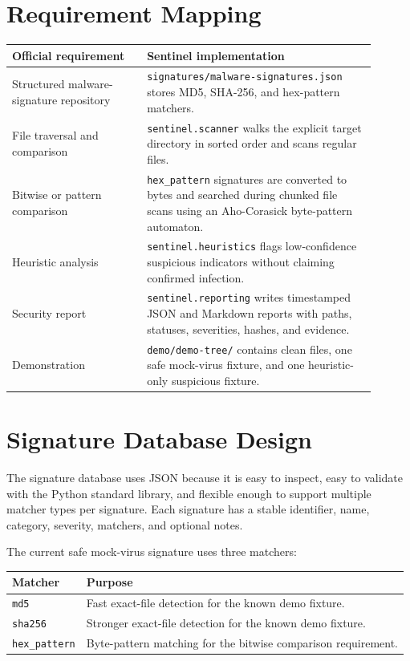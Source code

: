 \documentclass[11pt]{article}
\begin{document}
\section{Requirement Mapping}

\begin{longtable}{p{0.33\linewidth}p{0.57\linewidth}}
\toprule
\textbf{Official requirement} & \textbf{Sentinel implementation} \\
\midrule
Structured malware-signature repository &
\texttt{signatures/malware-signatures.json} stores MD5, SHA-256, and
hex-pattern matchers. \\
File traversal and comparison &
\texttt{sentinel.scanner} walks the explicit target directory in sorted order
and scans regular files. \\
Bitwise or pattern comparison &
\texttt{hex\_pattern} signatures are converted to bytes and searched during
chunked file scans using an Aho-Corasick byte-pattern automaton. \\
Heuristic analysis &
\texttt{sentinel.heuristics} flags low-confidence suspicious indicators without
claiming confirmed infection. \\
Security report &
\texttt{sentinel.reporting} writes timestamped JSON and Markdown reports with
paths, statuses, severities, hashes, and evidence. \\
Demonstration &
\texttt{demo/demo-tree/} contains clean files, one safe mock-virus fixture, and
one heuristic-only suspicious fixture. \\
\bottomrule
\end{longtable}

\section{Signature Database Design}

The signature database uses JSON because it is easy to inspect, easy to validate
with the Python standard library, and flexible enough to support multiple
matcher types per signature. Each signature has a stable identifier, name,
category, severity, matchers, and optional notes.

The current safe mock-virus signature uses three matchers:

\begin{center}
\begin{tabular}{ll}
\toprule
\textbf{Matcher} & \textbf{Purpose} \\
\midrule
\texttt{md5} & Fast exact-file detection for the known demo fixture. \\
\texttt{sha256} & Stronger exact-file detection for the known demo fixture. \\
\texttt{hex\_pattern} & Byte-pattern matching for the bitwise comparison requirement. \\
\bottomrule
\end{tabular}
\end{center}
\end{document}
